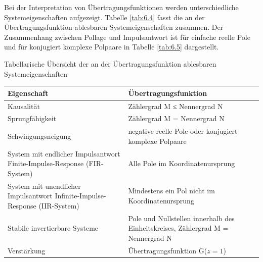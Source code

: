 Bei der Interpretation von Übertragungsfunktionen werden unterschiedliche Systemeigenschaften aufgezeigt. Tabelle \ref{tab:6.4} fasst die an der Übertragungsfunktion ablesbaren Systemeigenschaften zusammen. Der Zusammenhang zwischen Pollage und Impulsantwort ist für einfache reelle Pole und für konjugiert komplexe Polpaare in Tabelle \ref{tab:6.5} dargestellt.

\begin{summary}{Tabellarische Übersicht der an der Übertragungsfunktion ablesbaren Systemeigenschaften}
\label{tab:6.4}
\begin{center}
  \begin{tabular}{ll}
    \toprule
    Eigenschaft & Übertragungsfunktion \\
    \midrule
    Kausalität & Zählergrad M ≤ Nennergrad N \\
    Sprungfähigkeit & Zählergrad M = Nennergrad N \\
    Schwingungsneigung & negative reelle Pole oder konjugiert komplexe Polpaare \\
    System mit endlicher Impulsantwort 
Finite-Impulse-Response (FIR-System)
 & Alle Pole im Koordinatenursprung \\
    System mit unendlicher Impulsantwort 
Infinite-Impulse-Response (IIR-System)
 & 
Mindestens ein Pol nicht 
im Koordinatenursprung \\
    Stabile invertierbare Systeme & 
Pole und Nullstellen innerhalb des Einheitskreises, 
Zählergrad M = Nennergrad N \\
    Verstärkung & Übertragungsfunktion G(\(z = 1\)) \\
    \bottomrule
  \end{tabular}
\end{center}
\end{summary}

